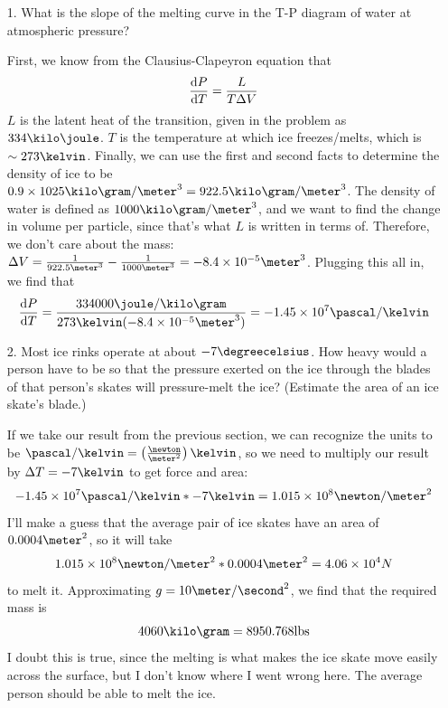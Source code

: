 \documentclass[a4paper,twoside]{article}
\begin{document}
\begin{itemize}
    \item[1.] What is the slope of the melting curve in the T-P diagram of water at atmospheric pressure?
        \begin{problem}
            First, we know from the Clausius-Clapeyron equation that
            \begin{equation}
                \dv{P}{T} = \frac{L}{T \Delta V}
            \end{equation}
            $ L $ is the latent heat of the transition, given in the problem as $ 334\kilo\joule $. $ T $ is the temperature at which ice freezes/melts, which is $ \sim 273\kelvin $. Finally, we can use the first and second facts to determine the density of ice to be $ 0.9 \times 1025\kilo\gram/\meter^3 = 922.5\kilo\gram/\meter^3 $. The density of water is defined as $ 1000\kilo\gram/\meter^3 $, and we want to find the change in volume per particle, since that's what $ L $ is written in terms of. Therefore, we don't care about the mass: $ \Delta V = \frac{1}{922.5\meter^3} - \frac{1}{1000\meter^3} = -8.4 \times 10^{-5} \meter^3 $. Plugging this all in, we find that
            \begin{equation}
                \dv{P}{T} = \frac{334000\joule/\kilo\gram}{273\kelvin(-8.4 \times 10^{-5} \meter^3)} = -1.45 \times 10^7 \pascal/\kelvin
            \end{equation}
        \end{problem}
    \item[2.] Most ice rinks operate at about $ -7\degreecelsius $. How heavy would a person have to be so that the pressure exerted on the ice through the blades of that person's skates will pressure-melt the ice? (Estimate the area of an ice skate's blade.)
        \begin{problem}
            If we take our result from the previous section, we can recognize the units to be $ \pascal/\kelvin = \left( \frac{\newton}{\meter^2} \right)\kelvin $, so we need to multiply our result by $ \Delta T = - 7\kelvin $ to get force and area:
            \begin{equation}
                -1.45 \times 10^7 \pascal/\kelvin * -7\kelvin = 1.015 \times 10^8 \newton/\meter^2
            \end{equation}
            I'll make a guess that the average pair of ice skates have an area of $ 0.0004\meter^2 $, so it will take
            \begin{equation}
                1.015 \times 10^8 \newton/\meter^2 * 0.0004\meter^2 = 4.06\times 10^4 N
            \end{equation}
            to melt it. Approximating $ g = 10\meter/\second^2 $, we find that the required mass is
            \begin{equation}
                4060\kilo\gram = 8950.768\text{lbs}
            \end{equation}
            I doubt this is true, since the melting is what makes the ice skate move easily across the surface, but I don't know where I went wrong here. The average person should be able to melt the ice.
        \end{problem}
\end{itemize}
\end{document}
